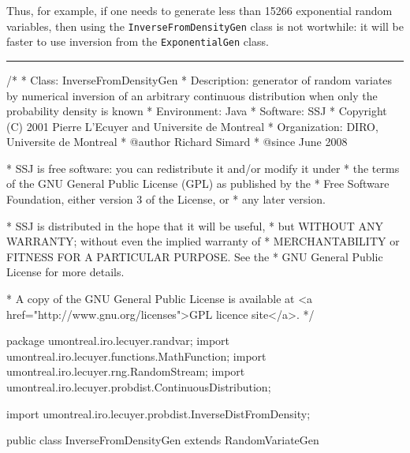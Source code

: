 Thus, for example, if one needs to generate less than 15266 exponential
random variables, then using the \texttt{InverseFromDensityGen} class
is not wortwhile: it will be faster to use inversion from the
\texttt{ExponentialGen} class.


\bigskip\hrule

\begin{code}
\begin{hide}
/*
 * Class:        InverseFromDensityGen
 * Description:  generator of random variates by numerical inversion of
                 an arbitrary continuous distribution when only the
                 probability density is known
 * Environment:  Java
 * Software:     SSJ
 * Copyright (C) 2001  Pierre L'Ecuyer and Universite de Montreal
 * Organization: DIRO, Universite de Montreal
 * @author       Richard Simard
 * @since        June 2008

 * SSJ is free software: you can redistribute it and/or modify it under
 * the terms of the GNU General Public License (GPL) as published by the
 * Free Software Foundation, either version 3 of the License, or
 * any later version.

 * SSJ is distributed in the hope that it will be useful,
 * but WITHOUT ANY WARRANTY; without even the implied warranty of
 * MERCHANTABILITY or FITNESS FOR A PARTICULAR PURPOSE.  See the
 * GNU General Public License for more details.

 * A copy of the GNU General Public License is available at
   <a href="http://www.gnu.org/licenses">GPL licence site</a>.
 */
\end{hide}
package umontreal.iro.lecuyer.randvar;
   import umontreal.iro.lecuyer.functions.MathFunction;
   import umontreal.iro.lecuyer.rng.RandomStream;
   import umontreal.iro.lecuyer.probdist.ContinuousDistribution;\begin{hide}
   import umontreal.iro.lecuyer.probdist.InverseDistFromDensity;
\end{hide}


public class InverseFromDensityGen extends RandomVariateGen \begin{hide} {
\end{hide}\end{code}

